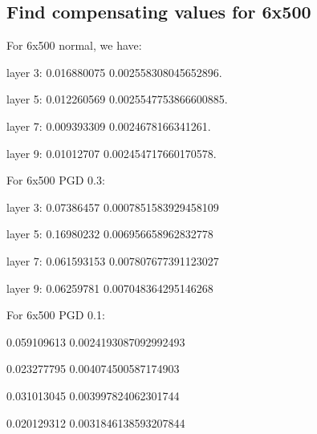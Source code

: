 \documentclass{llncs}
\begin{document}
\subsection*{Find compensating values for 6x500}

For 6x500 normal, we have:

layer 3:  0.016880075 0.002558308045652896.

layer 5:  0.012260569 0.0025547753866600885.

layer 7:  0.009393309 0.0024678166341261.

layer 9:  0.01012707 0.002454717660170578.


\vspace*{1ex}


For 6x500 PGD 0.3:



layer 3:  0.07386457 0.0007851583929458109

layer 5:  0.16980232 0.006956658962832778

layer 7:  0.061593153 0.007807677391123027

layer 9:  0.06259781 0.007048364295146268

\vspace*{1ex}

For 6x500 PGD 0.1:

0.059109613 0.0024193087092992493

0.023277795 0.004074500587174903

0.031013045 0.003997824062301744

0.020129312 0.0031846138593207844
\end{document}
